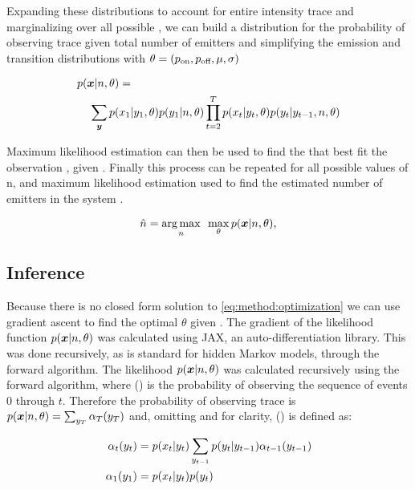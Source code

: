 Expanding these distributions to account for entire intensity trace \trace and marginalizing over all possible \states, we can build a distribution for the probability of observing trace \trace given total number of emitters \n and simplifying the emission and transition distributions with $\theta = (p_\text{on}, p_\text{off}, \mu, \sigma)$

\begin{align*}
  p(\bm{x}|n,\theta) &=\\
    \sum_{\bm{y}}
      p(&x_{1}|y_{1}, \theta)
      p(y_{1}|n, \theta)
      \prod_{t=2}^{T}
        p(x_{t}|y_{t}, \theta)
        p(y_{t}|y_{t-1},n, \theta)
  \label{eq:method:likelihood}
\end{align*}

Maximum likelihood estimation can then be used to find the \parameters that best fit the observation \trace, given \n. 
Finally this process can be repeated for all possible values of n, and maximum likelihood estimation used to find the estimated number of emitters in the system \estimatedn.

\begin{equation}
    \hat{n} =
    \mathop{\arg\max}_{n}\hspace{0.5em}
    \max_\theta
    p(\bm{x}|n,\theta)
  \text{,}
  \label{eq:method:optimization}
\end{equation}

\subsection{Inference}


Because there is no closed form solution to  \eqref{eq:method:optimization} we can use gradient ascent to find the optimal $\theta$ given \n.
The gradient of the likelihood function $p(\bm{x} | n, \theta)$ was calculated using JAX, an auto-differentiation library.
This was done recursively, as is standard for hidden Markov models, through the forward algorithm.
The likelihood $p(\bm{x} | n, \theta)$ was calculated recursively using the forward algorithm, where \pchain() is the probability of observing the sequence of events 0 through $t$.
Therefore the probability of observing trace \trace is $ p(\bm{x}|n,\theta) = \sum_{y_{T}} \alpha_T(y_{T})$ and, omitting \n and \parameters for clarity, \pchain()  is defined as:

\begin{align*}
  \alpha_{t}(y_{t}) &= p(x_{t}|y_{t}) \sum_{y_{t-1}} p(y_{t} | y_{t-1}) \alpha_{t-1}(y_{t-1})\\
  \alpha_{1}(y_{1}) &= p(x_{t}|y_{t}) p(y_{t})
\end{align*}

